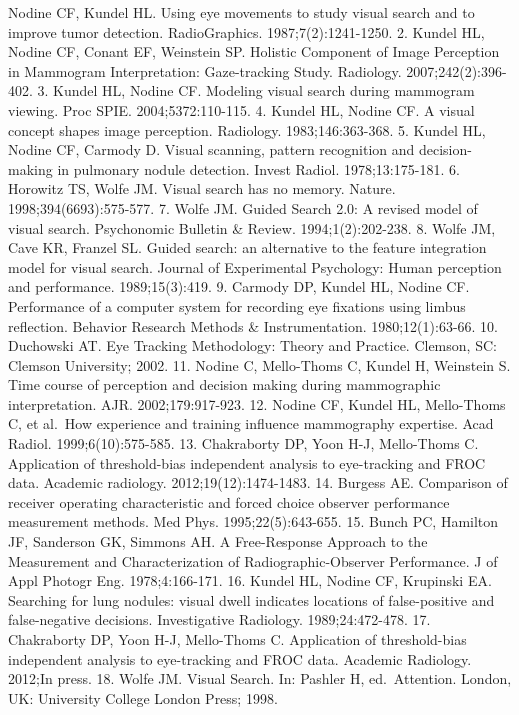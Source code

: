 \documentclass[
]{book}
\begin{document}
Nodine CF, Kundel HL. Using eye movements to study visual search and to improve tumor detection. RadioGraphics. 1987;7(2):1241-1250.
2. Kundel HL, Nodine CF, Conant EF, Weinstein SP. Holistic Component of Image Perception in Mammogram Interpretation: Gaze-tracking Study. Radiology. 2007;242(2):396-402.
3. Kundel HL, Nodine CF. Modeling visual search during mammogram viewing. Proc SPIE. 2004;5372:110-115.
4. Kundel HL, Nodine CF. A visual concept shapes image perception. Radiology. 1983;146:363-368.
5. Kundel HL, Nodine CF, Carmody D. Visual scanning, pattern recognition and decision-making in pulmonary nodule detection. Invest Radiol. 1978;13:175-181.
6. Horowitz TS, Wolfe JM. Visual search has no memory. Nature. 1998;394(6693):575-577.
7. Wolfe JM. Guided Search 2.0: A revised model of visual search. Psychonomic Bulletin \& Review. 1994;1(2):202-238.
8. Wolfe JM, Cave KR, Franzel SL. Guided search: an alternative to the feature integration model for visual search. Journal of Experimental Psychology: Human perception and performance. 1989;15(3):419.
9. Carmody DP, Kundel HL, Nodine CF. Performance of a computer system for recording eye fixations using limbus reflection. Behavior Research Methods \& Instrumentation. 1980;12(1):63-66.
10. Duchowski AT. Eye Tracking Methodology: Theory and Practice. Clemson, SC: Clemson University; 2002.
11. Nodine C, Mello-Thoms C, Kundel H, Weinstein S. Time course of perception and decision making during mammographic interpretation. AJR. 2002;179:917-923.
12. Nodine CF, Kundel HL, Mello-Thoms C, et al.~How experience and training influence mammography expertise. Acad Radiol. 1999;6(10):575-585.
13. Chakraborty DP, Yoon H-J, Mello-Thoms C. Application of threshold-bias independent analysis to eye-tracking and FROC data. Academic radiology. 2012;19(12):1474-1483.
14. Burgess AE. Comparison of receiver operating characteristic and forced choice observer performance measurement methods. Med Phys. 1995;22(5):643-655.
15. Bunch PC, Hamilton JF, Sanderson GK, Simmons AH. A Free-Response Approach to the Measurement and Characterization of Radiographic-Observer Performance. J of Appl Photogr Eng. 1978;4:166-171.
16. Kundel HL, Nodine CF, Krupinski EA. Searching for lung nodules: visual dwell indicates locations of false-positive and false-negative decisions. Investigative Radiology. 1989;24:472-478.
17. Chakraborty DP, Yoon H-J, Mello-Thoms C. Application of threshold-bias independent analysis to eye-tracking and FROC data. Academic Radiology. 2012;In press.
18. Wolfe JM. Visual Search. In: Pashler H, ed.~Attention. London, UK: University College London Press; 1998.
\end{document}
